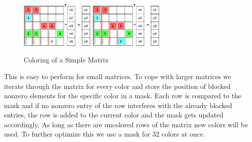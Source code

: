 \documentclass[a4paper,11pt]{scrartcl}
\begin{document}
\begin{figure}[ht]
\includegraphics[width=0.32\textwidth]{graphic/coloringT9.eps}\hfill\vline\hfill
\includegraphics[width=0.32\textwidth]{graphic/coloringT10.eps}
\caption{Coloring of a Simple Matrix}
\end{figure}

This is easy to perform for small matrices. To cope with larger matrices we
iterate through the matrix for every color and store the position of blocked
nonzero elements for the specific color in a mask.
Each row is compared to the mask and if no nonzero entry of the row interferes
with the already blocked entries, the row is added to the current color and the
mask gets updated accordingly.
As long as there are uncolored rows of the matrix new colors will be used.
To further optimize this we use a mask for 32 colors at once.
\end{document}
